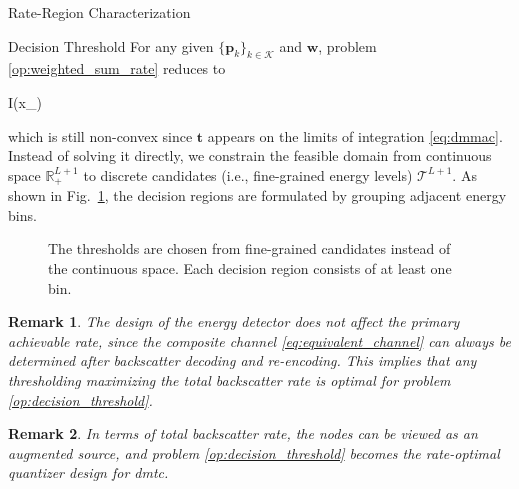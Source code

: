 \documentclass[journal]{IEEEtran}
\newtheorem{remark}{Remark}
\begin{document}
\begin{section}{Rate-Region Characterization}
	\begin{subsection}{Decision Threshold}
		For any given $\{\boldsymbol{p}_k\}_{k \in \mathcal{K}}$ and $\boldsymbol{w}$, problem \eqref{op:weighted_sum_rate} reduces to
		\begin{maxi!}
			{}{I(x_{})}{\label{op:decision_threshold}}{\label{ob:decision_threshold}}
			\addConstraint{\eqref{co:sequential_threshold},\eqref{co:nonnegative_threshold},}
		\end{maxi!}
		which is still non-convex since $\boldsymbol{t}$ appears on the limits of integration \eqref{eq:dmmac}.
		Instead of solving it directly, we constrain the feasible domain from continuous space $\mathbb{R}_+^{L+1}$ to discrete candidates (i.e., fine-grained energy levels) $\mathcal{T}^{L+1}$.
		As shown in Fig.~\ref{fg:discrete_outputs}, the decision regions are formulated by grouping adjacent energy bins.
		\begin{figure}[!t]
			\centering
			\resizebox{0.9\columnwidth}{!}{
				
			}
			\caption{The thresholds are chosen from fine-grained candidates instead of the continuous space. Each decision region consists of at least one bin.}
			\label{fg:discrete_outputs}
		\end{figure}

		\begin{remark}
			The design of the energy detector does not affect the primary achievable rate, since the composite channel \eqref{eq:equivalent_channel} can always be determined after backscatter decoding and re-encoding.
			This implies that any thresholding maximizing the total backscatter rate is optimal for problem \eqref{op:decision_threshold}.
			\label{re:backscatter_decision}
		\end{remark}

		\begin{remark}
			In terms of total backscatter rate, the nodes can be viewed as an augmented source, and problem \eqref{op:decision_threshold} becomes the rate-optimal quantizer design for \gls{dmtc}.
			\label{re:augmented_source}
		\end{remark}


\end{subsection}
\end{section}
\end{document}
